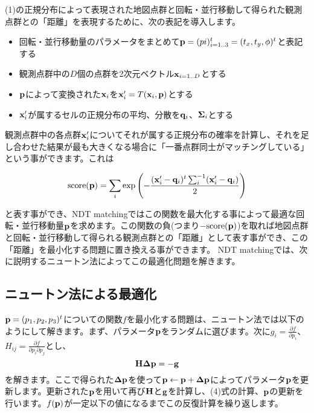 \documentclass[12pt]{article}
\newcommand{\mat}[1] { \mathrm{\bold{#1}} }
\begin{document}
(1)の正規分布によって表現された地図点群と回転・並行移動して得られた観測点群との「距離」を表現するために、次の表記を導入します。

\begin{itemize}
	\item 回転・並行移動量のパラメータをまとめて$\mat{p} = (pi)^t_{i=1..3} = (t_x, t_y, \phi)^t$と表記する
	\item 観測点群中の$D$個の点群を2次元ベクトル$\mat{x}_{i=1..D}$とする
	\item $\mat{p}$によって変換された$\mat{x}_i$を$\mat{x}'_i = T(\mat{x}_i, \mat{p})$とする
	\item $\mat{x}'_i$が属するセルの正規分布の平均、分散を$\mat{q}_i$、$\mat{\Sigma}_i$とする
\end{itemize}

観測点群中の各点群$\mat{x}'_i$についてそれが属する正規分布の確率を計算し、それを足し合わせた結果が最も大きくなる場合に「一番点群同士がマッチングしている」という事ができます。これは

\begin{equation}
	\mathrm{score}(\mat{p}) = \sum_i   \exp{  \left(  - \frac{ (\mat{x}'_i - \mat{q}_i)^t \sum^{-1}_i (\mat{x}'_i - \mat{q}_i)  }{2}   \right)  }  
\end{equation}

と表す事ができ、NDT matchingではこの関数を最大化する事によって最適な回転・並行移動量$\mat{p}$を求めます。この関数の負(つまり$-\mathrm{score}(\mat{p})$)を取れば地図点群と回転・並行移動して得られる観測点群との「距離」として表す事ができ、この「距離」を最小化する問題に置き換える事ができます。
NDT matchingでは、次に説明するニュートン法によってこの最適化問題を解きます。

\subsection{ニュートン法による最適化}
$\mat{p} = (p_1, p_2, p_3)^t$についての関数$f$を最小化する問題は、ニュートン法では以下のようにして解きます。まず、パラメータ$\mat{p}$をランダムに選びます。次に$g_i = \frac{\partial{f}}{ \partial p_i}$、$H_{ij} = \frac{\partial{f}}{ \partial p_i \partial p_j}$とし、
\begin{equation}
	\mat{H \Delta p} = -\mat{g}
\end{equation}
を解きます。ここで得られた$\mat{\Delta p}$を使って$\mat{p}  \leftarrow \mat{p} + \mat{\Delta p}$によってパラメータ$\mat{p}$を更新します。更新された$\mat{p}$を用いて再び$\mat{H}$と$\mat{g}$を計算し、(4)式の計算、$\mat{p}$の更新を行います。$f(\mat{p})$が一定以下の値になるまでこの反復計算を繰り返します。
\end{document}
